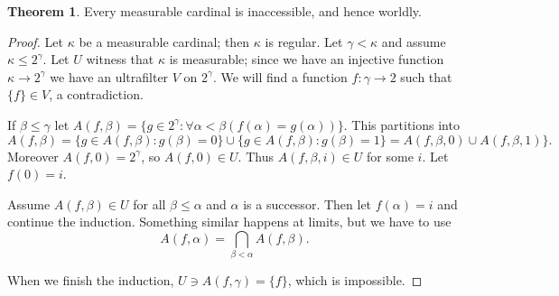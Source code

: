 \documentclass[12pt]{report}
\theoremstyle{definition}
\newtheorem{theorem}{Theorem}[chapter]
\begin{document}
\begin{theorem}
Every measurable cardinal is inaccessible, and hence worldly.
\end{theorem}
\begin{proof}
Let $\kappa$ be a measurable cardinal; then $\kappa$ is regular. Let $\gamma < \kappa$ and assume $\kappa \leq 2^\gamma$.
Let $U$ witness that $\kappa$ is measurable; since we have an injective function $\kappa \to 2^\gamma$ we have an ultrafilter $V$ on $2^\gamma$. We will find a function $f: \gamma \to 2$ such that $\{f\} \in V$, a contradiction.

If $\beta \leq \gamma$ let $A(f, \beta) = \{g \in 2^\gamma: \forall \alpha < \beta(f(\alpha) = g(\alpha))\}$.
This partitions into
$$A(f, \beta) = \{g \in A(f, \beta): g(\beta) = 0\} \cup \{g \in A(f, \beta): g(\beta) = 1\} = A(f, \beta, 0) \cup A(f, \beta, 1)\}.$$
Moreover $A(f, 0) = 2^\gamma$, so $A(f, 0) \in U$. Thus $A(f, \beta, i) \in U$ for some $i$. Let $f(0) = i$.

Assume $A(f, \beta) \in U$ for all $\beta \leq \alpha$ and $\alpha$ is a successor. Then let $f(\alpha) = i$ and continue the induction. Something similar happens at limits, but we have to use
$$A(f, \alpha) = \bigcap_{\beta < \alpha} A(f, \beta).$$

When we finish the induction, $U \ni A(f, \gamma) = \{f\}$, which is impossible.
\end{proof}
\end{document}
